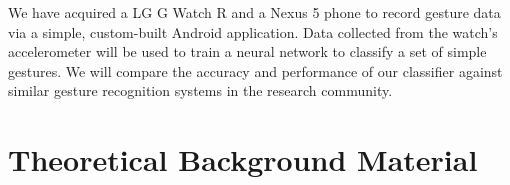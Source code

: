 \documentclass[]{article}
\begin{document}
We have acquired a LG G Watch R and a Nexus 5 phone to record gesture data via a simple, custom-built Android application. Data collected from the watch’s accelerometer will be used to train a neural network to classify a set of simple gestures. We will compare the accuracy and performance of our classifier against similar gesture recognition systems in the research community.

\section{Theoretical Background Material}
\end{document}

